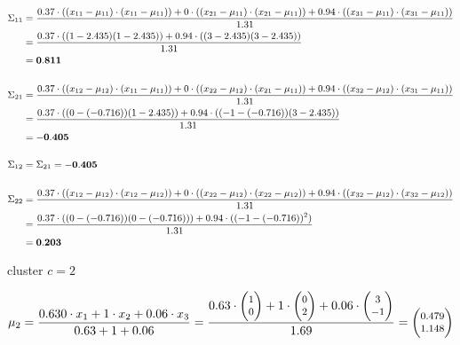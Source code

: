 \documentclass[12pt]{article}
\begin{document}
\begin{enumerate}
        \begin{equation*}
            \fontsize{9pt}{10pt}\selectfont
            \begin{aligned}
                \Sigma_{11} &= \frac{0.37 \cdot ((x_{11}-\mu_{11}) \cdot (x_{11} - \mu_{11}))+ 0 \cdot ((x_{21}-\mu_{11}) \cdot (x_{21} - \mu_{11}))+ 0.94 \cdot ((x_{31}-\mu_{11}) \cdot (x_{31} - \mu_{11}))}{1.31}\\
                &=\frac{0.37 \cdot ((1-2.435)(1-2.435)) + 0.94 \cdot ((3-2.435)(3-2.435))}{1.31} \\
                &= \mathbf{0.811}\\
                \\
                \Sigma_{21} &= \frac{0.37 \cdot ((x_{12}-\mu_{12}) \cdot (x_{11} - \mu_{11}))+ 0 \cdot ((x_{22}-\mu_{12}) \cdot (x_{21} - \mu_{11}))+ 0.94 \cdot ((x_{32}-\mu_{12}) \cdot (x_{31} - \mu_{11}))}{1.31}\\
                &=\frac{0.37 \cdot ((0-(-0.716))(1 - 2.435)) + 0.94 \cdot ((-1-(-0.716))(3-2.435))}{1.31} \\
                &= \mathbf{-0.405}\\
                \\
                \Sigma_{12} &= \Sigma_{21} = \mathbf{-0.405}\\
                \\
                \Sigma_{22} &= \frac{0.37 \cdot ((x_{12}-\mu_{12}) \cdot (x_{12} - \mu_{12}))+ 0 \cdot ((x_{22}-\mu_{12}) \cdot (x_{22} - \mu_{12}))+ 0.94 \cdot ((x_{32}-\mu_{12}) \cdot (x_{32} - \mu_{12}))}{1.31}\\
                &=\frac{0.37 \cdot ((0-(-0.716))(0-(-0.716))) + 0.94 \cdot ((-1-(-0.716))^2)}{1.31}\\
                &= \mathbf{0.203}\\
            \end{aligned}
        \end{equation*}

    \vspace{20pt}
     {cluster $c=2$}

    \begin{equation*}
        \fontsize{8pt}{10pt}\selectfont
        \mu_2 = \frac{0.630 \cdot x_1 + 1 \cdot x_2 + 0.06 \cdot x_3}{0.63+1+0.06} = \frac{0.63 \cdot \begin{pmatrix}
        1\\
        0
        \end{pmatrix}+ 1 \cdot \begin{pmatrix}
        0\\
        2
        \end{pmatrix} + 0.06 \cdot \begin{pmatrix}
        3\\
        -1
        \end{pmatrix}}{1.69} = \begin{pmatrix}
        0.479\\
        1.148
        \end{pmatrix}
    \end{equation*}


\end{enumerate}
\end{document}
